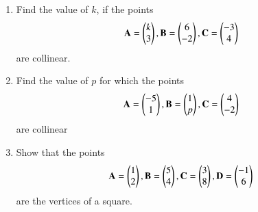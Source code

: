 \renewcommand{\theequation}{\theenumi}
\begin{enumerate}[label=\thesection.\arabic*.,ref=\thesection.\theenumi]

\item Find the value of $k$, if the points
\begin{align}
\mathbf {A}=\begin{pmatrix}k\\3\end{pmatrix},
\mathbf {B}=\begin{pmatrix}6\\-2\end{pmatrix},
\mathbf {C}=\begin{pmatrix}-3\\4\end{pmatrix}
\end{align}
are collinear.
\\
\solution

%
\item Find the value of $p$ for which the points
\begin{align}
\mathbf {A}=\begin{pmatrix}-5\\1\end{pmatrix},
\mathbf {B}=\begin{pmatrix}1\\p\end{pmatrix},
\mathbf {C}=\begin{pmatrix}4\\-2\end{pmatrix}
\end{align}
are collinear
\\
\solution


\item Show that the points 
\begin{align}
\mathbf {A}=\begin{pmatrix}1\\2\end{pmatrix},
\mathbf {B}=\begin{pmatrix}5\\4\end{pmatrix},
\mathbf {C}=\begin{pmatrix}3\\8\end{pmatrix},
\mathbf {D}=\begin{pmatrix}-1\\6\end{pmatrix}
\end{align}
are the vertices of a square.
\\
\solution



\end{enumerate}